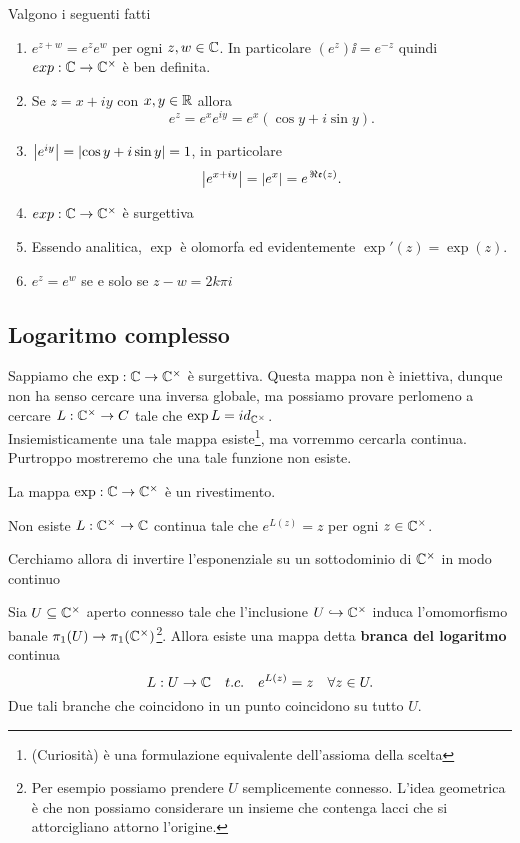 \begin{multicols*}{2}
\begin{proposition}\label{ProprietaEsponenzialeComplesso}
Valgono i seguenti fatti
\begin{enumerate}[noitemsep]
\item $e^{z+w}=e^ze^w$ per ogni $z,w\in \mathbb{C}$. In particolare $(e^{z})\ii=e^{-z}$ quindi $exp:\mathbb{C}\to \mathbb{C}^\times$ \`e ben definita.
\item Se $z=x+iy$ con $x,y\in \mathbb{R}$ allora
\[e^z=e^xe^{iy}=e^x(\cos y+i\sin y).\]
\item $\left|e^{iy}\right|=\left|\cos y+i\sin y\right|=1$, in particolare
\[\left|e^{x+iy}\right|=\left|e^x\right|=e^{\,\Re\mathfrak{e}(z)}.\]
\item $exp:\mathbb{C}\to \mathbb{C}^\times$ \`e surgettiva
\item Essendo analitica, $\exp$ \`e olomorfa ed evidentemente $\exp'(z)=\exp(z)$.
\item $e^z=e^w$ se e solo se $z-w=2k\pi i$
\end{enumerate}
\end{proposition}


\subsection{Logaritmo complesso}
Sappiamo che $\exp:\mathbb{C}\to \mathbb{C}^\times$ \`e surgettiva. Questa mappa non \`e iniettiva, dunque non ha senso cercare una inversa globale, ma possiamo provare perlomeno a cercare $L:\mathbb{C}^\times\to C$ tale che $\exp L=id_{\mathbb{C}^\times}$.\\
Insiemisticamente una tale mappa esiste\footnote{(Curiosit\`a) \`e una formulazione equivalente dell'assioma della scelta}, ma vorremmo cercarla continua. Purtroppo mostreremo che una tale funzione non esiste.

\begin{proposition}\label{EsponenzialeComplessoERivestimento}
La mappa $\exp:\mathbb{C}\to \mathbb{C}^\times$ \`e un rivestimento.
\end{proposition}

\begin{corollary}
Non esiste $L:\mathbb{C}^\times\to \mathbb{C}$ continua tale che $e^{L(z)}=z$ per ogni $z\in\mathbb{C}^\times$.
\end{corollary}

\noindent
Cerchiamo allora di invertire l'esponenziale su un sottodominio di $\mathbb{C}^\times$ in modo continuo

\begin{theorem}\label{BrancheDelLogaritmo}
Sia $U\subseteq \mathbb{C}^\times$ aperto connesso tale che l'inclusione $U\hookrightarrow \mathbb{C}^\times$ induca l'omomorfismo banale $\pi_1(U)\to \pi_1(\mathbb{C}^\times)$\footnote{Per esempio possiamo prendere $U$ semplicemente connesso. L'idea geometrica \`e che non possiamo considerare un insieme che contenga lacci che si attorcigliano attorno l'origine.}. Allora esiste una mappa detta \textbf{branca del logaritmo} continua
\[L:U\to\mathbb{C}\quad t.c.\quad e^{L(z)}=z\quad \forall z\in U.\]
Due tali branche che coincidono in un punto coincidono su tutto $U$.
\end{theorem}


\end{multicols*}
